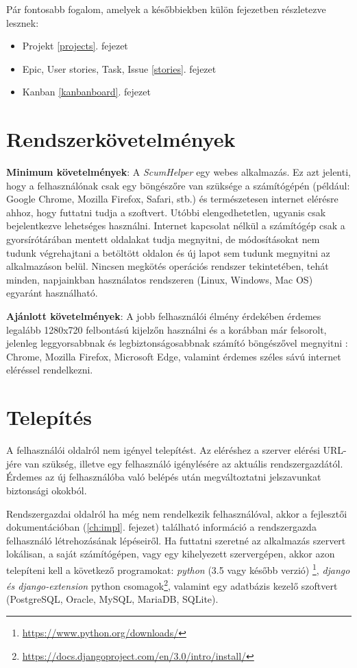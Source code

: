 Pár fontosabb fogalom, amelyek a későbbiekben külön fejezetben részletezve lesznek:
\begin{itemize}
	\item Projekt \ref{projects}. fejezet
	\item Epic, User stories, Task, Issue \ref{stories}. fejezet
	\item Kanban \ref{kanbanboard}. fejezet
\end{itemize}

\newpage

\section{Rendszerkövetelmények} %

\textbf{Minimum követelmények}: A \textit{ScumHelper} egy webes alkalmazás. Ez azt jelenti, hogy a felhasználónak csak egy böngészőre van szüksége a számítógépén (például: Google Chrome, Mozilla Firefox, Safari, stb.) és természetesen internet elérésre ahhoz, hogy futtatni tudja a szoftvert. Utóbbi elengedhetetlen, ugyanis csak bejelentkezve lehetséges használni. Internet kapcsolat nélkül a számítógép csak a gyorsírótárában mentett oldalakat tudja megnyitni, de módosításokat nem tudunk végrehajtani a betöltött oldalon és új lapot sem tudunk megnyitni az alkalmazáson belül. Nincsen megkötés operációs rendszer tekintetében, tehát minden, napjainkban használatos rendszeren (Linux, Windows, Mac OS) egyaránt használható. 

\textbf{Ajánlott követelmények}: A jobb felhasználói élmény érdekében érdemes legalább 1280x720 felbontású kijelzőn használni és a korábban már felsorolt, jelenleg leggyorsabbnak és legbiztonságosabbnak számító böngészővel megnyitni : Chrome, Mozilla Firefox, Microsoft Edge, valamint érdemes széles sávú internet eléréssel rendelkezni.

\section{Telepítés}
\label{install}

A felhasználói oldalról nem igényel telepítést. Az eléréshez a szerver elérési URL-jére van szükség, illetve egy felhasználó igénylésére az aktuális rendszergazdától. Érdemes az új felhasználóba való belépés után megváltoztatni jelszavunkat biztonsági okokból.

Rendszergazdai oldalról ha még nem rendelkezik felhasználóval, akkor a fejlesztői dokumentációban (\ref{ch:impl}. fejezet) található információ a rendszergazda felhasználó létrehozásának lépéseiről.  Ha futtatni szeretné az alkalmazás szervert lokálisan, a saját számítógépen, vagy egy kihelyezett szervergépen, akkor azon telepíteni kell a következő programokat:  \textit{python} (3.5 vagy később verzió) \footnote{\url{https://www.python.org/downloads/}}, \textit{django és django-extension} python csomagok\footnote{\url{https://docs.djangoproject.com/en/3.0/intro/install/}}, valamint egy adatbázis kezelő szoftvert (PostgreSQL, Oracle, MySQL, MariaDB, SQLite).


